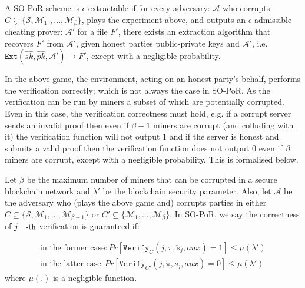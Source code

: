 \begin{definition}\label{extractable} A SO-PoR scheme is $\epsilon$-extractable if  for every adversary: $\mathcal{A}$ who corrupts $C\subsetneq\{\mathcal{S},\mathcal{M}_{\scriptscriptstyle 1} $ $,..., \mathcal{M}_{\scriptscriptstyle\beta}\}$, plays the experiment above, and outputs an $\epsilon$-admissible cheating prover: $\mathcal{A}'$ for a file $F'$,  there exists an extraction algorithm that recovers $F'$ from $\mathcal{A}'$, given honest parties public-private keys and $\mathcal{A}'$,  i.e. $\mathtt{Ext}(\hat{sk},\hat{pk},\mathcal{A}')\rightarrow F'$, except with a negligible probability. 
\end{definition}


In the above game, the environment, acting on an honest party's behalf, performs the verification correctly; which is not always the case in SO-PoR. As the verification can be run by miners a subset of which are potentially corrupted. Even in this case, the verification correctness must hold, e.g.  if a corrupt server sends an  invalid proof then even if $\beta-1$ miners are corrupt (and colluding with it) the verification function will not output $1$ and if the server is honest and submits a valid proof then the verification function does not output $0$ even if $\beta$ miners are corrupt, except with a negligible probability. This is formalised below. 


\begin{definition}\label{Verification-Correctness} Let $\beta$ be the maximum number of miners that can be corrupted in a secure blockchain network and $\lambda'$ be the blockchain security parameter. Also, let $\mathcal{A}$ be the adversary who (plays the above game and) corrupts parties in either $C\subseteq\{\mathcal{S},\mathcal{M}_{\scriptscriptstyle 1},...,\mathcal{M}_{\scriptscriptstyle\beta-1}\}$ or $C'\subseteq\{\mathcal{M}_{\scriptscriptstyle 1},...,\mathcal{M}_{\scriptscriptstyle\beta}\}$.  In SO-PoR, we say the correctness of $j\text{\small-th}$ verification  is guaranteed if: 
 
$$\begin{array}{l}
\text{in the former case}: Pr[\mathtt{Verify}_{\scriptscriptstyle C}(j,\pi,\ddot{s}_{\scriptscriptstyle j},aux)=1]\leq \mu(\lambda')\\

\text{in the latter case}: Pr[\mathtt{Verify}_{\scriptscriptstyle C'}(j,\pi,\ddot{s}_{\scriptscriptstyle j},aux)=0]\leq \mu(\lambda')
\end{array}$$
where $\mu(.)$ is a negligible function. 
\end{definition}

